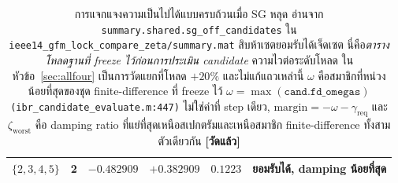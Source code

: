 \documentclass[12pt,a4paper]{article}
\theoremstyle{remark}
\newcommand{\zworst}{\zeta_{\mathrm{worst}}}
\newcommand{\greq}{\gamma_{\mathrm{req}}}
\newcommand{\code}[1]{\texttt{\small #1}}
\newcommand{\measured}{\textcolor{ok}{\textbf{[วัดแล้ว]}}}
\begin{document}
\begin{table}[H]
\begin{tabular}{@{}clrrcl@{}}
\midrule
$\{2,3,4,5\}$  & 2 & $-0.482909$ & $+0.382909$ & $\mathbf{0.1223}$ & ยอมรับได้, damping น้อยที่สุด\\
\bottomrule
\end{tabular}
\caption{การแจกแจงความเป็นไปได้แบบครบถ้วนเมื่อ SG หลุด อ่านจาก
\code{summary.shared.sg\_off\_candidates} ใน
\code{ieee14\_gfm\_lock\_compare\_zeta/summary.mat} สิบห้าเซตยอมรับได้เจ็ดเซต
นี่คือ\emph{ตารางโหลดฐานที่ freeze ไว้ก่อนการประเมิน candidate} ความไวต่อระดับโหลด
ในหัวข้อ~\ref{sec:allfour} เป็นการวัดแยกที่โหลด $+20\%$ และไม่แก้แถวเหล่านี้
$\omega$ คือสมาชิกที่หน่วงน้อยที่สุดของชุด finite-difference ที่ freeze ไว้
$\omega = \max(\texttt{cand.fd\_omegas})$ \code{(ibr\_candidate\_evaluate.m:447)}
ไม่ใช่ค่าที่ step เดียว, $\mathrm{margin} = -\omega - \greq$ และ $\zworst$ คือ
damping ratio ที่แย่ที่สุดเหนือสเปกตรัมและเหนือสมาชิก finite-difference
ทั้งสามตัวเดียวกัน \measured}
\label{tab:adm}
\end{table}
\end{document}
